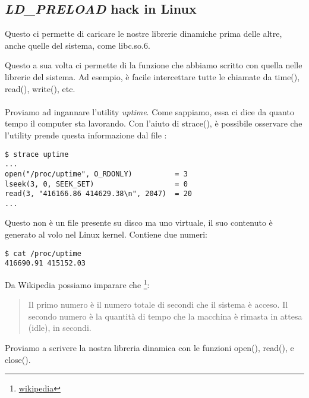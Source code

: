 \subsection{\emph{LD\_PRELOAD} hack in Linux}

\label{ld_preload}

Questo ci permette di caricare le nostre librerie dinamiche prima delle altre, anche quelle del sistema, come libc.so.6.

Questo a sua volta ci permette di  la funzione che abbiamo scritto con quella nelle librerie del sistema.
Ad esempio, è facile intercettare tutte le chiamate da  
time(), read(), write(), etc. \\
\\
Proviamo ad ingannare l'utility \emph{uptime}.
Come sappiamo, essa ci dice da quanto tempo il computer sta lavorando.
Con l'aiuto di strace(), è possibile osservare che l'utility prende questa informazione dal file :

\begin{lstlisting}
$ strace uptime 
...
open("/proc/uptime", O_RDONLY)          = 3
lseek(3, 0, SEEK_SET)                   = 0
read(3, "416166.86 414629.38\n", 2047)  = 20
...
\end{lstlisting}

Questo non è un file presente su disco ma uno virtuale, il suo contenuto è generato al volo nel Linux kernel.
Contiene due numeri:

\begin{lstlisting}
$ cat /proc/uptime
416690.91 415152.03
\end{lstlisting}

Da Wikipedia possiamo imparare che
\footnote{\href{http://go.yurichev.com/17043}{wikipedia}}:

\begin{framed}
\begin{quotation}
Il primo numero è il numero totale di secondi che il sistema è acceso.
Il secondo numero è la quantità di tempo che la macchina è rimasta in attesa (idle), in secondi.
\end{quotation}
\end{framed}


Proviamo a scrivere la nostra libreria dinamica con le funzioni open(), read(), e close().

